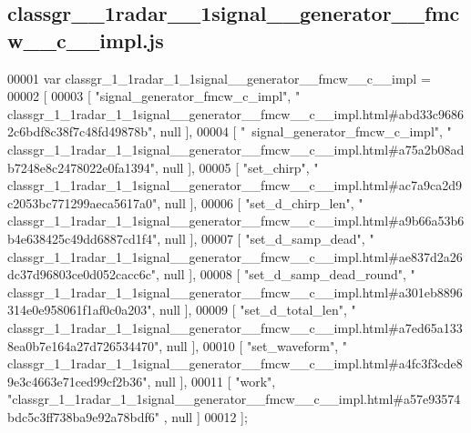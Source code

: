 \subsection{classgr\+\_\+\_\+1radar\+\_\+\_\+1signal\+\_\+\+\_\+generator\+\_\+\+\_\+fmcw\+\_\+\+\_\+c\+\_\+\+\_\+impl.\+js}
\label{classgr__1__1radar__1__1signal____generator____fmcw____c____impl_8js_source}

\begin{DoxyCode}
00001 var classgr_1_1radar_1_1signal__generator__fmcw__c__impl =
00002 [
00003     [ \textcolor{stringliteral}{"signal\_generator\_fmcw\_c\_impl"}, \textcolor{stringliteral}{"
      classgr\_1\_1radar\_1\_1signal\_\_generator\_\_fmcw\_\_c\_\_impl.html#abd33c96862c6bdf8c38f7c48fd49878b"}, null ],
00004     [ \textcolor{stringliteral}{"~signal\_generator\_fmcw\_c\_impl"}, \textcolor{stringliteral}{"
      classgr\_1\_1radar\_1\_1signal\_\_generator\_\_fmcw\_\_c\_\_impl.html#a75a2b08adb7248e8c2478022e0fa1394"}, null ],
00005     [ \textcolor{stringliteral}{"set\_chirp"}, \textcolor{stringliteral}{"
      classgr\_1\_1radar\_1\_1signal\_\_generator\_\_fmcw\_\_c\_\_impl.html#ac7a9ca2d9c2053bc771299aeca5617a0"}, null ],
00006     [ \textcolor{stringliteral}{"set\_d\_chirp\_len"}, \textcolor{stringliteral}{"
      classgr\_1\_1radar\_1\_1signal\_\_generator\_\_fmcw\_\_c\_\_impl.html#a9b66a53b6b4e638425c49dd6887cd1f4"}, null ],
00007     [ \textcolor{stringliteral}{"set\_d\_samp\_dead"}, \textcolor{stringliteral}{"
      classgr\_1\_1radar\_1\_1signal\_\_generator\_\_fmcw\_\_c\_\_impl.html#ae837d2a26dc37d96803ce0d052cacc6c"}, null ],
00008     [ \textcolor{stringliteral}{"set\_d\_samp\_dead\_round"}, \textcolor{stringliteral}{"
      classgr\_1\_1radar\_1\_1signal\_\_generator\_\_fmcw\_\_c\_\_impl.html#a301eb8896314e0e958061f1af0c0a203"}, null ],
00009     [ \textcolor{stringliteral}{"set\_d\_total\_len"}, \textcolor{stringliteral}{"
      classgr\_1\_1radar\_1\_1signal\_\_generator\_\_fmcw\_\_c\_\_impl.html#a7ed65a1338ea0b7e164a27d726534470"}, null ],
00010     [ \textcolor{stringliteral}{"set\_waveform"}, \textcolor{stringliteral}{"
      classgr\_1\_1radar\_1\_1signal\_\_generator\_\_fmcw\_\_c\_\_impl.html#a4fc3f3cde89e3c4663e71ced99cf2b36"}, null ],
00011     [ \textcolor{stringliteral}{"work"}, \textcolor{stringliteral}{"classgr\_1\_1radar\_1\_1signal\_\_generator\_\_fmcw\_\_c\_\_impl.html#a57e93574bdc5c3ff738ba9e92a78bdf6"}
      , null ]
00012 ];
\end{DoxyCode}
